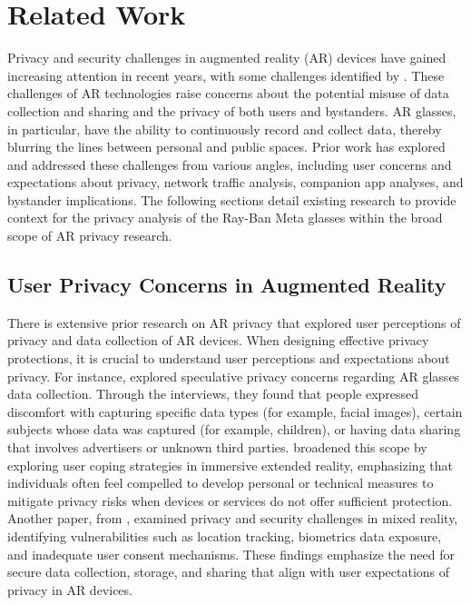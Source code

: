 \chapter{Related Work} 
\label{chap:relatedWork}

Privacy and security challenges in augmented reality (AR) devices have gained increasing attention in recent years, with some challenges identified by \citet{ARSec2011}. These challenges of AR technologies raise concerns about the potential misuse of data collection and sharing and the privacy of both users and bystanders. AR glasses, in particular, have the ability to continuously record and collect data, thereby blurring the lines between personal and public spaces. Prior work has explored and addressed these challenges from various angles, including user concerns and expectations about privacy, network traffic analysis, companion app analyses, and bystander implications. The following sections detail existing research to provide context for the privacy analysis of the Ray-Ban Meta glasses within the broad scope of AR privacy research.

\section*{User Privacy Concerns in Augmented Reality}
There is extensive prior research on AR privacy that explored user perceptions of privacy and data collection of AR devices. When designing effective privacy protections, it is crucial to understand user perceptions and expectations about privacy. For instance, \citet{Gallardo2023SpeculativePC} explored speculative privacy concerns regarding AR glasses data collection. Through the interviews, they found that people expressed discomfort with capturing specific data types (for example, facial images), certain subjects whose data was captured (for example, children), or having data sharing that involves advertisers or unknown third parties. \citet{ExtendedRealityPrivacy2023} broadened this scope by exploring user coping strategies in immersive extended reality, emphasizing that individuals often feel compelled to develop personal or technical measures to mitigate privacy risks when devices or services do not offer sufficient protection. Another paper, from \citet{De_Guzman_2019}, examined privacy and security challenges in mixed reality, identifying vulnerabilities such as location tracking, biometrics data exposure, and inadequate user consent mechanisms. These findings emphasize the need for secure data collection, storage, and sharing that align with user expectations of privacy in AR devices.

